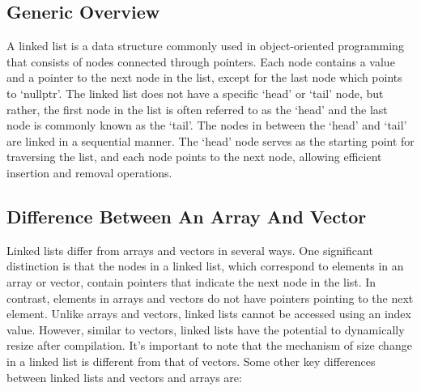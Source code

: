 \documentclass[a4paper,9pt]{article}
\begin{document}
\subsection*{Generic Overview}

A linked list is a data structure commonly used in object-oriented programming that consists of nodes 
connected through 
pointers. Each node contains a value and a pointer to the next node in the list, except for the last node 
which points 
to `nullptr'. The linked list does not have a specific `head' or `tail' node, but rather, the first node in 
the list is 
often referred to as the `head' and the last node is commonly known as the `tail'. The nodes in between the 
`head' and 
`tail' are linked in a sequential manner. The `head' node serves as the starting point for traversing the 
list, and each 
node points to the next node, allowing efficient insertion and removal operations.

\subsection*{Difference Between An Array And Vector}

Linked lists differ from arrays and vectors in several ways. One significant distinction is that the nodes in 
a linked list, 
which correspond to elements in an array or vector, contain pointers that indicate the next node in the list. 
In contrast, 
elements in arrays and vectors do not have pointers pointing to the next element. Unlike arrays and vectors, 
linked lists 
cannot be accessed using an index value. However, similar to vectors, linked lists have the potential to 
dynamically resize 
after compilation. It's important to note that the mechanism of size change in a linked list is different 
from that of vectors.
Some other key differences between linked lists and vectors and arrays are:
\end{document}
